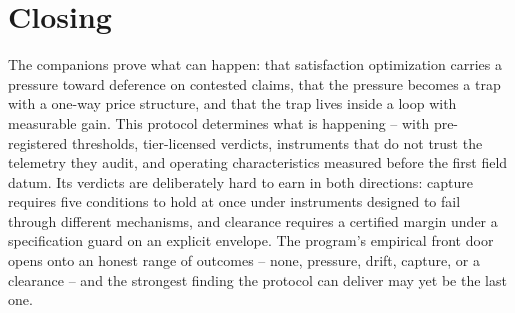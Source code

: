 \documentclass[11pt]{article}
\theoremstyle{definition}
\theoremstyle{remark}
\numberwithin{equation}{section}
\begin{document}
\section*{Closing}

The companions prove what can happen: that satisfaction optimization carries a pressure toward deference on contested claims, that the pressure becomes a trap with a one-way price structure, and that the trap lives inside a loop with measurable gain. This protocol determines what is happening -- with pre-registered thresholds, tier-licensed verdicts, instruments that do not trust the telemetry they audit, and operating characteristics measured before the first field datum. Its verdicts are deliberately hard to earn in both directions: capture requires five conditions to hold at once under instruments designed to fail through different mechanisms, and clearance requires a certified margin under a specification guard on an explicit envelope. The program's empirical front door opens onto an honest range of outcomes -- none, pressure, drift, capture, or a clearance -- and the strongest finding the protocol can deliver may yet be the last one.



\end{document}
